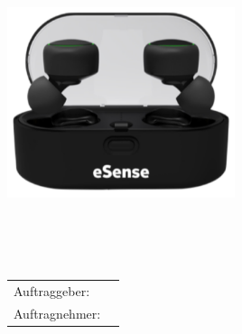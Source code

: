 \begin{titlepage}
\maketitle
\thispagestyle{empty} %

\begin{verbatim}
















\end{verbatim}
\begin{center}
\includegraphics[width=0.5\textwidth]{EarablesBild.PNG}
\end{center}
\begin{verbatim}




\end{verbatim}


  \begin{tabular}[t]{p{4 cm}p{8 cm}}
	Auftraggeber:  & \auftraggeber\\[1.2ex]
	Auftragnehmer: & \auftragnehmer\\[1.2ex]
  \end{tabular}


\end{titlepage}
